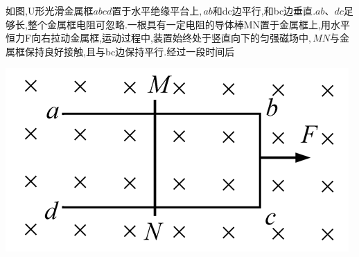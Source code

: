 \question[6]如图,U形光滑金属框$abcd$置于水平绝缘平台上$,ab$和dc边平行,和bc边垂直$.ab、dc$足够长,整个金属框电阻可忽略.一根具有一定电阻的导体棒MN置于金属框上,用水平恒力F向右拉动金属框,运动过程中,装置始终处于竖直向下的匀强磁场中$,MN$与金属框保持良好接触,且与bc边保持平行.经过一段时间后
\begin{center}
\includegraphics[]{img/image5.png}
\end{center}

\begin{solution}{4cm}

\end{solution}



